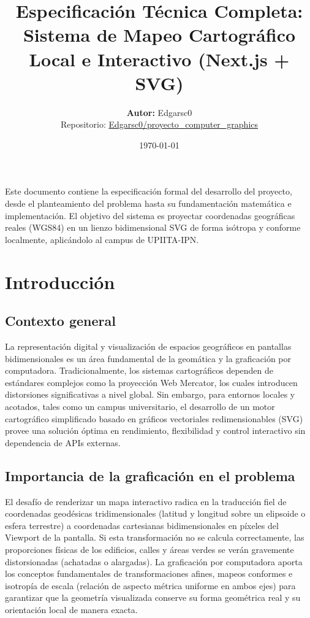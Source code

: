 \documentclass[12pt,a4paper]{article}
\title{
    \vspace{2cm}
    \textbf{Especificación Técnica Completa:\\Sistema de Mapeo Cartográfico Local e Interactivo (Next.js + SVG)}\\
    \vspace{1cm}
}
\author{
    \textbf{Autor:} Edgarsc0\\
    \small{Repositorio: \href{https://github.com/Edgarsc0/proyecto_computer_graphics}{Edgarsc0/proyecto\_computer\_graphics}}
}
\date{\today}
\begin{document}
\maketitle
\thispagestyle{empty}
\newpage

Este documento contiene la especificación formal del desarrollo del proyecto, desde el planteamiento del problema hasta su fundamentación matemática e implementación. El objetivo del sistema es proyectar coordenadas geográficas reales (WGS84) en un lienzo bidimensional SVG de forma isótropa y conforme localmente, aplicándolo al campus de UPIITA-IPN.

\section{Introducción}

\subsection{Contexto general}
La representación digital y visualización de espacios geográficos en pantallas bidimensionales es un área fundamental de la geomática y la graficación por computadora. Tradicionalmente, los sistemas cartográficos dependen de estándares complejos como la proyección Web Mercator, los cuales introducen distorsiones significativas a nivel global. Sin embargo, para entornos locales y acotados, tales como un campus universitario, el desarrollo de un motor cartográfico simplificado basado en gráficos vectoriales redimensionables (SVG) provee una solución óptima en rendimiento, flexibilidad y control interactivo sin dependencia de APIs externas.

\subsection{Importancia de la graficación en el problema}
El desafío de renderizar un mapa interactivo radica en la traducción fiel de coordenadas geodésicas tridimensionales (latitud y longitud sobre un elipsoide o esfera terrestre) a coordenadas cartesianas bidimensionales en píxeles del Viewport de la pantalla. Si esta transformación no se calcula correctamente, las proporciones físicas de los edificios, calles y áreas verdes se verán gravemente distorsionadas (achatadas o alargadas). La graficación por computadora aporta los conceptos fundamentales de transformaciones afines, mapeos conformes e isotropía de escala (relación de aspecto métrica uniforme en ambos ejes) para garantizar que la geometría visualizada conserve su forma geométrica real y su orientación local de manera exacta.
\end{document}
